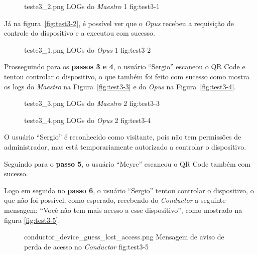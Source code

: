 \begin{figure}[h!]
    {teste3_2.png}
    {LOGs do \emph{Maestro} 1}
    {fig:test3-1}
\end{figure}

Já na figura~\ref{fig:test3-2}, é possível ver que o \emph{Opus} recebeu a requisição de controle do dispositivo e a executou com sucesso.

\begin{figure}[h!]
    {teste3_1.png}
    {LOGs do \emph{Opus} 1}
    {fig:test3-2}
\end{figure}

Prosseguindo para os \textbf{passos 3 e 4}, o usuário ``Sergio'' escaneou o QR Code e tentou controlar o dispositivo, 
o que também foi feito com sucesso como mostra os logs do \emph{Maestro} na Figura~\ref{fig:test3-3} e do \emph{Opus} na Figura~\ref{fig:test3-4}.

\begin{figure}[h!]
    {teste3_3.png}
    {LOGs do \emph{Maestro} 2}
    {fig:test3-3}
\end{figure}

\begin{figure}[h!]
    {teste3_4.png}
    {LOGs do \emph{Opus} 2}
    {fig:test3-4}
\end{figure}

O usuário ``Sergio'' é reconhecido como visitante, pois não tem permissões de administrador, mas está temporariamente autorizado a controlar o dispositivo.

Seguindo para o \textbf{passo 5}, o usuário ``Meyre'' escaneou o QR Code também com sucesso.

Logo em seguida no \textbf{passo 6}, o usuário ``Sergio'' tentou controlar o dispositivo, o que não foi possível, como esperado, recebendo do \emph{Conductor}
a seguinte mensagem: ``Você não tem mais acesso a esse dispositivo'', como mostrado na figura \ref{fig:test3-5}.

\begin{figure}[h!]
    {conductor_device_guess_lost_access.png}
    {Mensagem de aviso de perda de acesso no \emph{Conductor}}
    {fig:test3-5}
\end{figure}

